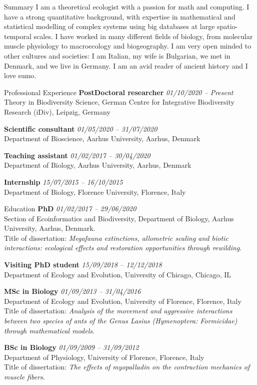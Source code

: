 \documentclass{resume} %
\begin{document}
\begin{rSection}{Summary}
I am a theoretical ecologist with a passion for math and computing.
I have a strong quantitative background, with expertise in mathematical and statistical modelling of complex systems using big databases at large spatio-temporal scales.
I have worked in many different fields of biology, from molecular muscle physiology to macroecology and biogeography.
I am very open minded to other cultures and societies: I am Italian, my wife is Bulgarian, we met in Denmark, and we live in Germany.
I am an avid reader of ancient history and I love sumo.
\end{rSection}

\begin{rSection}{Professional Experience}
{\bf PostDoctoral researcher} \hfill {\em 01/10/2020 -- Present}\\
Theory in Biodiversity Science, German Centre for Integrative Biodiversity Research (iDiv), Leipzig, Germany

{\bf Scientific consultant} \hfill {\em 01/05/2020 -- 31/07/2020}\\
Department of Bioscience, Aarhus University, Aarhus, Denmark

{\bf Teaching assistant} \hfill {\em 01/02/2017 -- 30/04/2020}\\
Department of Biology, Aarhus University, Aarhus, Denmark

{\bf Internship} \hfill {\em 15/07/2015 -- 16/10/2015}\\
Department of Biology, Florence University, Florence, Italy
\end{rSection}

\begin{rSection}{Education}
{\bf PhD} \hfill {\em 01/02/2017 -- 29/06/2020} 
\\ Section of Ecoinformatics and Biodiversity, Department of Biology, Aarhus University, Aarhus, Denmark.
\\ Title of dissertation: \textit{Megafauna extinctions, allometric scaling and biotic interactions: ecological effects and restoration opportunities through rewilding}.

{\bf Visiting PhD student} \hfill {\em 15/09/2018 -- 12/12/2018}
\\ Department of Ecology and Evolution, University of Chicago, Chicago, IL

{\bf MSc in Biology} \hfill {\em 01/09/2013 -- 31/04/2016}
\\ Department of Ecology and Evolution, University of Florence, Florence, Italy
\\ Title of dissertation: \textit{Analysis of the movement and aggressive interactions between two species of ants of the Genus Lasius (Hymenoptera: Formicidae) through mathematical models}.

{\bf BSc in Biology} \hfill {\em 01/09/2009 -- 31/09/2012}
\\ Department of Physiology, University of Florence, Florence, Italy
\\ Title of dissertation: \textit{The effects of myopalladin on the contraction mechanics of muscle fibers}.
\end{rSection}
\end{document}
